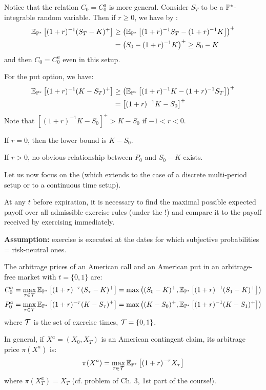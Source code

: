 \begin{remark}
    Notice that the relation $C_0 = C_0^a$ is more general. Consider $S_T$ to be a $\mathbb P^*$-integrable random variable. Then if $r \geq 0$, we have by :
    \begin{align*}
        \mathbb E_{\mathbb P^*} \left[ (1+r)^{-1} (S_T - K)^+ \right] &\geq \left( \mathbb E_{\mathbb P^*} \left[ (1+r)^{-1} S_T - (1+r)^{-1} K \right] \right)^+ \\
        &= \left( S_0 - (1+r)^{-1} K \right)^+ \geq S_0 - K
    \end{align*}
    and then $C_0 = C_0^a$ even in this setup.
    
    For the put option, we have:
    \begin{align*}
        \mathbb E_{\mathbb P^*} \left[ (1+r)^{-1} (K - S_T)^+ \right] &\geq \left( \mathbb E_{\mathbb P^*} \left[ (1+r)^{-1} K - (1+r)^{-1} S_T \right] \right)^+ \\
        &= \left[ (1+r)^{-1} K - S_0 \right]^+
    \end{align*}
    Note that $\left[ (1+r)^{-1} K - S_0 \right]^+ > K - S_0$ if $-1 < r < 0$.
    
    If $r = 0$, then the lower bound is $K - S_0$.
    
    If $r > 0$, no obvious relationship between $P_0$ and $S_0 - K$ exists.
\end{remark}

\begin{remark}
    Let us now focus on the  (which extends to the case of a discrete multi-period setup or to a continuous time setup).
    
    At any $t$ before expiration, it is necessary to find the maximal possible expected payoff over all admissible exercise rules (under the !) and compare it to the payoff received by exercising immediately.
    
    \textbf{Assumption:} exercise is executed at the dates for which subjective probabilities = risk-neutral ones.
\end{remark}

\begin{proposition}
    The arbitrage prices of an American call and an American put in an arbitrage-free market with $t = \{0, 1\}$ are:
    \begin{align*}
        C_0^a &= \max_{\tau \in \mathcal{T}} \mathbb E_{\mathbb P^*} \left[ (1+r)^{-\tau} (S_\tau - K)^+ \right] = \max \left( (S_0 - K)^+, \mathbb E_{\mathbb P^*} \left[ (1+r)^{-1} (S_1 - K)^+ \right] \right) \\
        P_0^a &= \max_{\tau \in \mathcal{T}} \mathbb E_{\mathbb P^*} \left[ (1+r)^{-\tau} (K - S_\tau)^+ \right] = \max \left( (K - S_0)^+, \mathbb E_{\mathbb P^*} \left[ (1+r)^{-1} (K - S_1)^+ \right] \right)
    \end{align*}
    where $\mathcal{T}$ is the set of exercise times, $\mathcal{T} = \{0, 1\}$.
    
    In general, if $X^a = (X_0, X_T)$ is an American contingent claim, its arbitrage price $\pi(X^a)$ is:
    \[ \pi(X^a) = \max_{\tau \in \mathcal{T}} \mathbb E_{\mathbb P^*} \left[ (1+r)^{-\tau} X_\tau \right] \]
    where $\pi(X_T^a) = X_T$ (cf. problem of Ch. 3, 1st part of the course!).
\end{proposition}


